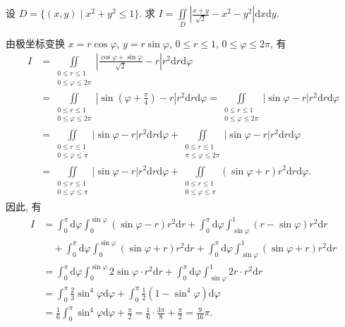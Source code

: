 \documentclass[../../main.tex]{subfiles}
\begin{document}
\begin{example}
设 \( D = \{ (x,y) \mid x^2 + y^2 \leqslant 1 \} \). 求 \( I = \iint\limits_D \left| \frac{x + y}{\sqrt{2}} - x^2 - y^2 \right| \mathrm{d}x\mathrm{d}y \).
\end{example}
\begin{solution}
由极坐标变换 \( x = r\cos\varphi \), \( y = r\sin\varphi \), \( 0 \leqslant r \leqslant 1 \), \( 0 \leqslant \varphi \leqslant 2\pi \), 有
\begin{align*}
I &= \iint\limits_{\substack{0 \leqslant r \leqslant 1 \\ 0 \leqslant \varphi \leqslant 2\pi}} \left| \frac{\cos\varphi + \sin\varphi}{\sqrt{2}} - r \right| r^2 \mathrm{d}r\mathrm{d}\varphi
\\
&= \iint\limits_{\substack{0 \leqslant r \leqslant 1 \\ 0 \leqslant \varphi \leqslant 2\pi}} \left| \sin\left( \varphi + \frac{\pi}{4} \right) - r \right| r^2 \mathrm{d}r\mathrm{d}\varphi = \iint\limits_{\substack{0 \leqslant r \leqslant 1 \\ 0 \leqslant \varphi \leqslant 2\pi}} \left| \sin\varphi - r \right| r^2 \mathrm{d}r\mathrm{d}\varphi
\\
&= \iint\limits_{\substack{0 \leqslant r \leqslant 1 \\ 0 \leqslant \varphi \leqslant \pi}} \left| \sin\varphi - r \right| r^2 \mathrm{d}r\mathrm{d}\varphi + \iint\limits_{\substack{0 \leqslant r \leqslant 1 \\ \pi \leqslant \varphi \leqslant 2\pi}} \left| \sin\varphi - r \right| r^2 \mathrm{d}r\mathrm{d}\varphi
\\
&= \iint\limits_{\substack{0 \leqslant r \leqslant 1 \\ 0 \leqslant \varphi \leqslant \pi}} \left| \sin\varphi - r \right| r^2 \mathrm{d}r\mathrm{d}\varphi + \iint\limits_{\substack{0 \leqslant r \leqslant 1 \\ 0 \leqslant \varphi \leqslant \pi}} (\sin\varphi + r) r^2 \mathrm{d}r\mathrm{d}\varphi.
\end{align*}
因此, 有
\begin{align*}
I &= \int_0^\pi \mathrm{d}\varphi \int_0^{\sin\varphi} (\sin\varphi - r) r^2 \mathrm{d}r + \int_0^\pi \mathrm{d}\varphi \int_{\sin\varphi}^1 (r - \sin\varphi) r^2 \mathrm{d}r
\\
&\quad + \int_0^\pi \mathrm{d}\varphi \int_0^{\sin\varphi} (\sin\varphi + r) r^2 \mathrm{d}r + \int_0^\pi \mathrm{d}\varphi \int_{\sin\varphi}^1 (\sin\varphi + r) r^2 \mathrm{d}r
\\
&= \int_0^\pi \mathrm{d}\varphi \int_0^{\sin\varphi} 2\sin\varphi \cdot r^2 \mathrm{d}r + \int_0^\pi \mathrm{d}\varphi \int_{\sin\varphi}^1 2r \cdot r^2 \mathrm{d}r
\\
&= \int_0^\pi \frac{2}{3} \sin^4\varphi \mathrm{d}\varphi + \int_0^\pi \frac{1}{2}(1 - \sin^4\varphi) \mathrm{d}\varphi
\\
&= \frac{1}{6} \int_0^\pi \sin^4\varphi \mathrm{d}\varphi + \frac{\pi}{2} = \frac{1}{6} \cdot \frac{3\pi}{8} + \frac{\pi}{2} = \frac{9}{16}\pi.
\end{align*}

\end{solution}
\end{document}
